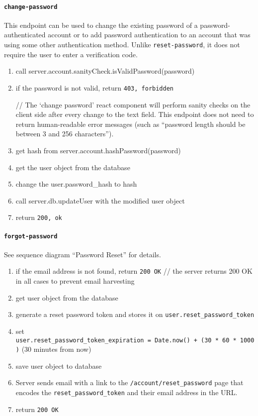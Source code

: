 \hypertarget{change-password}{%
\paragraph{\texorpdfstring{\texttt{change-password}}{change-password}}\label{change-password}}

This endpoint can be used to change the existing password of a
password-authenticated account or to add password authentication to an
account that was using some other authentication method. Unlike
\texttt{reset-password}, it does not require the user to enter a
verification code.

\begin{enumerate}
\def\labelenumi{\arabic{enumi}.}
\item
  call server.account.sanityCheck.isValidPassword(password)
\item
  if the password is not valid, return \texttt{403,\ forbidden}

  // The `change password' react component will perform sanity checks on
  the client side after every change to the text field. This endpoint
  does not need to return human-readable error messages (such as
  ``password length should be between 3 and 256 characters'').
\item
  get hash from server.account.hashPassword(password)
\item
  get the user object from the database
\item
  change the user.password\_hash to hash
\item
  call server.db.updateUser with the modified user object
\item
  return \texttt{200,\ ok}
\end{enumerate}

\hypertarget{forgot-password}{%
\paragraph{\texorpdfstring{\texttt{forgot-password}}{forgot-password}}\label{forgot-password}}

See sequence diagram ``Password Reset'' for details.

\begin{enumerate}
\def\labelenumi{\arabic{enumi}.}
\item
  if the email address is not found, return \texttt{200\ OK} // the
  server returns 200 OK in all cases to prevent email harvesting
\item
  get user object from the database
\item
  generate a reset password token and stores it on
  \texttt{user.reset\_password\_token}
\item
  set
  \texttt{user.reset\_password\_token\_expiration\ =\ Date.now()\ +\ (30\ *\ 60\ *\ 1000)}
  (30 minutes from now)
\item
  save user object to database
\item
  Server sends email with a link to the
  \texttt{/account/reset\_password} page that encodes the
  \texttt{reset\_password\_token} and their email address in the URL.
\item
  return \texttt{200\ OK}
\end{enumerate}

